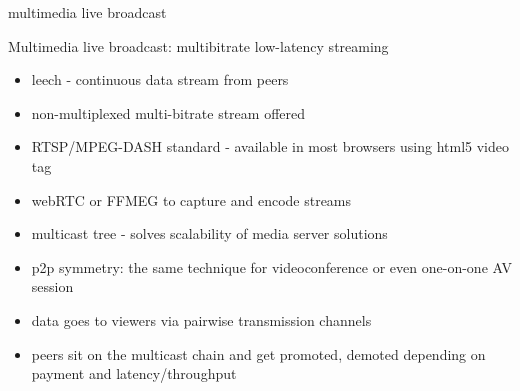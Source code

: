 \documentclass{beamer}
\begin{document}
\begin{section}{multimedia live broadcast}




\begin{frame}{}
\begin{block}{Multimedia live broadcast: multibitrate low-latency streaming}
 \begin{itemize}
    \item leech - continuous data stream from peers
    \item non-multiplexed multi-bitrate stream offered
    \item RTSP/MPEG-DASH standard - available in most browsers using html5 video tag
    \item webRTC or FFMEG to capture and encode streams
    \item multicast tree - solves scalability of media server solutions
    \item p2p symmetry: the same technique for videoconference or even one-on-one AV session
    \item data goes to viewers via pairwise transmission channels
    \item peers sit on the multicast chain and get  promoted, demoted depending on payment and latency/throughput
\end{itemize}
\end{block}
\end{frame}


\end{section}
\end{document}
